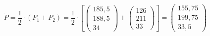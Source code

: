 \documentclass[
fontsize=10pt, 
listof = totoc,
parskip = half	
]{report}
\begin{document}
\begin{equation}
	\dot{P} =	\frac{1}{2} \cdot \left(P_1 + P_2\right) =
				\frac{1}{2}\cdot
				\left[
				\begin{pmatrix}
					185,5\\
					188,5\\
					34
				\end{pmatrix}
				+
				\begin{pmatrix}
					126\\
					211\\
					33
				\end{pmatrix}
				\right]
				=
				\begin{pmatrix}
					155,75\\
					199,75\\
					33,5
				\end{pmatrix}
\end{equation}
\end{document}
